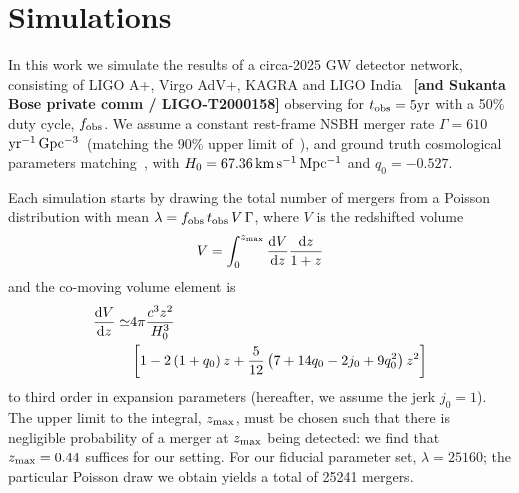 \documentclass[%
 reprint,
 superscriptaddress,
 nofootinbib,
 amsmath,amssymb,
 aps,
]{revtex4-2}
\newcommand{\hubble}{\ensuremath{H_0}}
\newcommand{\decel}{\ensuremath{q_0}}
\newcommand{\jerk}{\ensuremath{j_0}}
\newcommand{\zmax}{\ensuremath{z_{\rm max}}}
\newcommand{\tobs}{t_{\rm obs}}
\newcommand{\fobs}{f_{\rm obs}}
\newcommand{\kmsmpc}{\ensuremath{{\rm km\,s^{-1}\,Mpc^{-1}}}}
\newcommand{\yr}{\ensuremath{{\rm yr}}}
\newcommand{\yrgpc}{\ensuremath{{\rm yr^{-1}\,Gpc^{-3}}}}
\begin{document}

\section{Simulations} \label{sec:sims}

In this work we simulate the results of a circa-2025 GW detector network, consisting of LIGO A+, Virgo AdV+, KAGRA and LIGO India~\citep{Abbott_etal:2013} {\bf [and Sukanta Bose private comm / LIGO-T2000158]} observing for $\tobs = 5 \yr$ with a 50\% duty cycle, $\fobs$. We assume a constant rest-frame  NSBH merger rate $\Gamma = 610$ \yrgpc\ (matching the 90\% upper limit of~\cite{Ligo:2018}), and ground truth cosmological parameters matching~\cite{Planck_VI:2018}, with $\hubble=67.36\,\kmsmpc$ and $\decel=-0.527$.


Each simulation starts by drawing the total number of mergers from a Poisson distribution with mean $\lambda = \fobs \, \tobs \, V \, \Gamma $, where $V$ is the redshifted volume
\begin{equation}
V = \int_0^{\zmax} \frac{{\rm d}V}{{\rm d}z} \frac{{\rm d}z}{1+z}
\end{equation}
and the co-moving volume element is
\begin{align}
\frac{{\rm d}V}{{\rm d}z} \simeq & 4\pi \frac{c^3 z^2}{\hubble^3} \\
& \left[1 - 2 \left(1 + \decel \right) z + \frac{5}{12} \left(7 + 14 \decel - 2 \jerk + 9 \decel^2 \right) z^2 \right] \nonumber
\end{align}
to third order in expansion parameters (hereafter, we assume the jerk $j_0 = 1$). The upper limit to the integral, $\zmax$, must be chosen such that there is negligible probability of a merger at $\zmax$ being detected: we find that $\zmax=0.44$ suffices for our setting. For our fiducial parameter set, $\lambda = 25160$; the particular Poisson draw we obtain yields a total of 25241 mergers.
\end{document}
